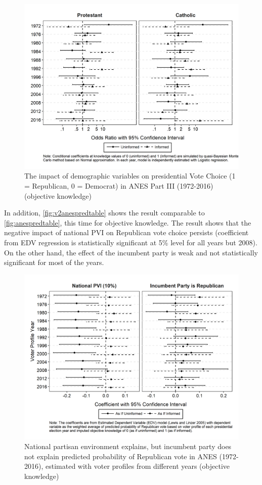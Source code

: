 \begin{figure}[ht!!!]
    \caption{The impact of demographic variables on presidential Vote Choice (1 = Republican, 0 = Democrat) in ANES Part III (1972-2016) (objective knowledge)}
    \label{fig:v2anescoefplot_dem3}
    \includegraphics[width=\linewidth]{../outputs/m2sq_anescoefplot_dem3.png}
\end{figure}

\par In addition, \autoref{fig:v2anespredtable} shows the result comparable to \autoref{fig:anespredtable}, this time for objective knowledge. The result shows that the negative impact of national PVI on Republican vote choice persists (coefficient from EDV regression is statistically significant at 5\% level for all years but 2008). On the other hand, the effect of the incumbent party is weak and not statistically significant for most of the years.   

\begin{figure}[ht!!!]
    \caption{National partisan environment explains, but incumbent party does not explain predicted probability of Republican vote in ANES (1972-2016), estimated with voter profiles from different years (objective knowledge)}
    \label{fig:v2anespredtable}
    \includegraphics[width=\linewidth]{../outputs/m2sq_anespredtable.png}
\end{figure}

